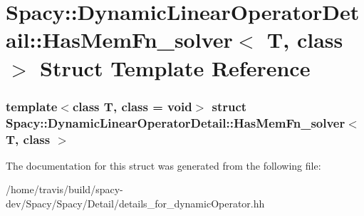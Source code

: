 \hypertarget{structSpacy_1_1DynamicLinearOperatorDetail_1_1HasMemFn__solver}{\section{\-Spacy\-:\-:\-Dynamic\-Linear\-Operator\-Detail\-:\-:\-Has\-Mem\-Fn\-\_\-solver$<$ \-T, class $>$ \-Struct \-Template \-Reference}
\label{structSpacy_1_1DynamicLinearOperatorDetail_1_1HasMemFn__solver}
}
\subsubsection*{template$<$class T, class = void$>$ struct Spacy\-::\-Dynamic\-Linear\-Operator\-Detail\-::\-Has\-Mem\-Fn\-\_\-solver$<$ T, class $>$}



\-The documentation for this struct was generated from the following file\-:\begin{DoxyCompactItemize}
\item 
/home/travis/build/spacy-\/dev/\-Spacy/\-Spacy/\-Detail/details\-\_\-for\-\_\-dynamic\-Operator.\-hh\end{DoxyCompactItemize}
